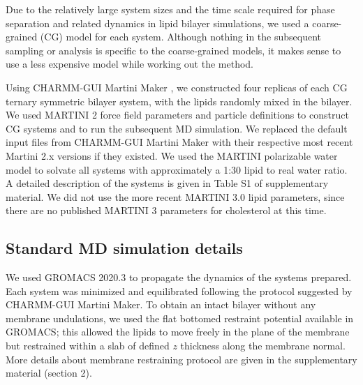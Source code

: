 \documentclass{biophys-new}
\begin{document}
Due to the relatively large system sizes and the time scale required for phase separation and related dynamics in lipid bilayer simulations, we used a coarse-grained (CG) model for each system. Although nothing in the subsequent sampling or analysis is specific to the coarse-grained models, it makes sense to use a less expensive model while working out the method.

Using CHARMM-GUI Martini Maker \cite{Qi2015}, we constructed four replicas of each CG ternary symmetric bilayer system, with the lipids randomly mixed in the bilayer.
We used MARTINI 2 force field parameters and particle definitions\cite{Marrink2007, DeJong2013} to construct CG systems and to run the subsequent MD simulation.
We replaced the default input files from CHARMM-GUI Martini Maker with their respective most recent Martini 2.x versions if they existed.
We used the MARTINI polarizable water model\cite{Yesylevskyy2010} to solvate all systems with approximately a 1:30 lipid to real water ratio.
A detailed description of the systems is given in Table S1 of supplementary material.
We did not use the more recent MARTINI 3.0 lipid parameters, since there are no published MARTINI 3 parameters for cholesterol at this time.

\subsection*{Standard MD simulation details}

We used GROMACS 2020.3\cite{Abraham2015} to propagate the dynamics of the systems prepared.
Each system was minimized and equilibrated following the protocol suggested by CHARMM-GUI Martini Maker.
To obtain an intact bilayer without any membrane undulations, we used
the flat bottomed restraint potential available in GROMACS; this allowed the lipids to move freely in the plane of the membrane but restrained within a slab of defined $z$ thickness along the membrane normal.
More details about membrane restraining protocol are given in the supplementary material (section 2).
\end{document}
